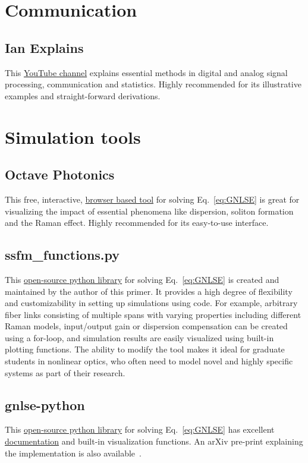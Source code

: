 \section{Communication}


\subsection*{Ian Explains}
This \href{https://www.youtube.com/@iain_explains/videos}{YouTube channel} explains essential methods in digital and analog signal processing, communication and statistics. Highly recommended for its illustrative examples and straight-forward derivations.


\section{Simulation tools}

\subsection*{Octave Photonics}
This free, interactive, \href{https://www.octavephotonics.com/nlse}{browser based tool} for solving Eq.~\ref{eq:GNLSE} is great for visualizing the impact of essential phenomena like dispersion, soliton formation and the Raman effect. Highly recommended for its easy-to-use interface.

\subsection*{ssfm\_functions.py}
This \href{https://github.com/OleKrarup123/NLSE-vector-solver/tree/main}{open-source python library} for solving Eq.~\ref{eq:GNLSE} is created and maintained by the author of this primer. It provides a high degree of flexibility and customizability in setting up simulations using code. For example, arbitrary fiber links consisting of multiple spans with varying properties including different Raman models, input/output gain or dispersion compensation can be created using a for-loop, and simulation results are easily visualized using built-in plotting functions. The ability to modify the tool makes it ideal for graduate students in nonlinear optics, who often need to model novel and highly specific systems as part of their research.   

\subsection*{gnlse-python}
This \href{https://github.com/WUST-FOG/gnlse-python}{open-source python library} for solving Eq.~\ref{eq:GNLSE} has excellent \href{https://gnlse.readthedocs.io/en/latest/index.html}{documentation} and built-in visualization functions. An arXiv pre-print explaining the implementation is also available~\cite{redman2021gnlsepythonopensourcesoftware}. 

